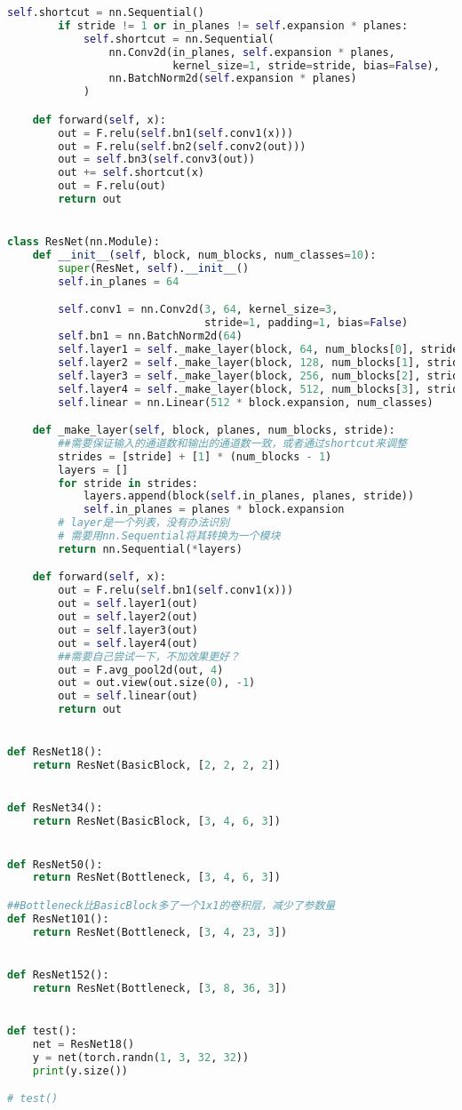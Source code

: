 \documentclass{article}
\begin{document}
\begin{lstlisting}[language=Python]
        self.shortcut = nn.Sequential()
        if stride != 1 or in_planes != self.expansion * planes:
            self.shortcut = nn.Sequential(
                nn.Conv2d(in_planes, self.expansion * planes,
                          kernel_size=1, stride=stride, bias=False),
                nn.BatchNorm2d(self.expansion * planes)
            )

    def forward(self, x):
        out = F.relu(self.bn1(self.conv1(x)))
        out = F.relu(self.bn2(self.conv2(out)))
        out = self.bn3(self.conv3(out))
        out += self.shortcut(x)
        out = F.relu(out)
        return out


class ResNet(nn.Module):
    def __init__(self, block, num_blocks, num_classes=10):
        super(ResNet, self).__init__()
        self.in_planes = 64

        self.conv1 = nn.Conv2d(3, 64, kernel_size=3,
                               stride=1, padding=1, bias=False)
        self.bn1 = nn.BatchNorm2d(64)
        self.layer1 = self._make_layer(block, 64, num_blocks[0], stride=1)
        self.layer2 = self._make_layer(block, 128, num_blocks[1], stride=2)
        self.layer3 = self._make_layer(block, 256, num_blocks[2], stride=2)
        self.layer4 = self._make_layer(block, 512, num_blocks[3], stride=2)
        self.linear = nn.Linear(512 * block.expansion, num_classes)

    def _make_layer(self, block, planes, num_blocks, stride):
        ##需要保证输入的通道数和输出的通道数一致，或者通过shortcut来调整
        strides = [stride] + [1] * (num_blocks - 1)
        layers = []
        for stride in strides:
            layers.append(block(self.in_planes, planes, stride))
            self.in_planes = planes * block.expansion
        # layer是一个列表，没有办法识别
        # 需要用nn.Sequential将其转换为一个模块
        return nn.Sequential(*layers)

    def forward(self, x):
        out = F.relu(self.bn1(self.conv1(x)))
        out = self.layer1(out)
        out = self.layer2(out)
        out = self.layer3(out)
        out = self.layer4(out)
        ##需要自己尝试一下，不加效果更好？
        out = F.avg_pool2d(out, 4)
        out = out.view(out.size(0), -1)
        out = self.linear(out)
        return out


def ResNet18():
    return ResNet(BasicBlock, [2, 2, 2, 2])


def ResNet34():
    return ResNet(BasicBlock, [3, 4, 6, 3])


def ResNet50():
    return ResNet(Bottleneck, [3, 4, 6, 3])

##Bottleneck比BasicBlock多了一个1x1的卷积层，减少了参数量
def ResNet101():
    return ResNet(Bottleneck, [3, 4, 23, 3])


def ResNet152():
    return ResNet(Bottleneck, [3, 8, 36, 3])


def test():
    net = ResNet18()
    y = net(torch.randn(1, 3, 32, 32))
    print(y.size())

# test()
\end{lstlisting}
\end{document}
